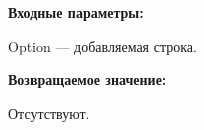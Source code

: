 \textbf{Входные параметры:}

Option --- добавляемая строка.

\textbf{Возвращаемое значение:}

Отсутствуют.
